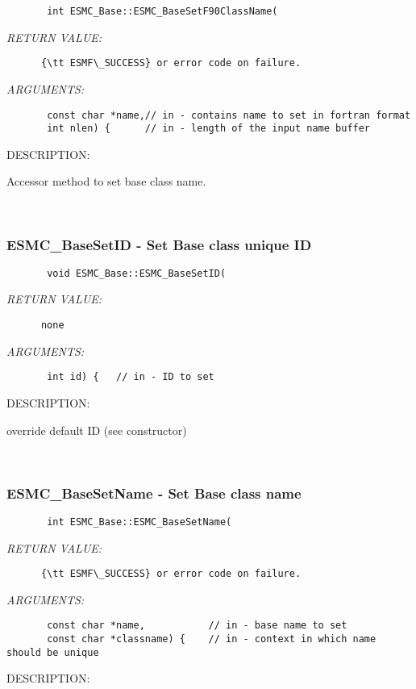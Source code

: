  
\begin{verbatim}       int ESMC_Base::ESMC_BaseSetF90ClassName(\end{verbatim}{\em RETURN VALUE:}
\begin{verbatim}      {\tt ESMF\_SUCCESS} or error code on failure.\end{verbatim}{\em ARGUMENTS:}
\begin{verbatim}       const char *name,// in - contains name to set in fortran format
       int nlen) {      // in - length of the input name buffer\end{verbatim}
{\sf DESCRIPTION:\\ }


      Accessor method to set base class name.
   
 
\mbox{}\hrulefill\
 
\subsubsection [ESMC\_BaseSetID] {ESMC\_BaseSetID - Set Base class unique ID}


  
\begin{verbatim}       void ESMC_Base::ESMC_BaseSetID(\end{verbatim}{\em RETURN VALUE:}
\begin{verbatim}      none\end{verbatim}{\em ARGUMENTS:}
\begin{verbatim}       int id) {   // in - ID to set\end{verbatim}
{\sf DESCRIPTION:\\ }


       override default ID (see constructor)
   
 
\mbox{}\hrulefill\
 
\subsubsection [ESMC\_BaseSetName] {ESMC\_BaseSetName - Set Base class name}


  
\begin{verbatim}       int ESMC_Base::ESMC_BaseSetName(\end{verbatim}{\em RETURN VALUE:}
\begin{verbatim}      {\tt ESMF\_SUCCESS} or error code on failure.\end{verbatim}{\em ARGUMENTS:}
\begin{verbatim}       const char *name,           // in - base name to set
       const char *classname) {    // in - context in which name should be unique\end{verbatim}
{\sf DESCRIPTION:\\ }


